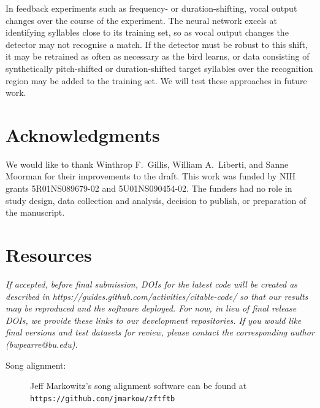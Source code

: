 \documentclass[10pt,letterpaper]{article}
\let\oldmarginpar\marginpar
\renewcommand{\marginpar}[1]{\oldmarginpar{\linespread{1}\scriptsize{#1}}}
\begin{document}
In feedback experiments such as frequency- or duration-shifting, vocal
output changes over the course of the experiment.  The neural network
excels at identifying syllables close to its training set, so as vocal
output changes the detector may not recognise a match.  If the
detector must be robust to this shift, it may be retrained as often as
necessary as the bird learns, or data consisting of synthetically
pitch-shifted or duration-shifted target syllables over the
recognition region may be added to the training set.  We will test
these approaches in future work.

\section{Acknowledgments}
We would like to thank Winthrop F.~Gillis, William A.~Liberti, and Sanne Moorman for
their improvements to the draft.  This work was funded by NIH grants
5R01NS089679-02 and 5U01NS090454-02.  The funders had no role in study design, data collection and analysis, decision to publish, or preparation of the manuscript.

\appendix

\section{Resources}
\label{sec:resources}

{\em If accepted, before final submission, DOIs for the latest code will be created as described in https://guides.github.com/activities/citable-code/ so that our results may be reproduced and the software deployed.  For now, in lieu of final release DOIs, we provide these links to our development repositories.  If you would like final versions and test datasets for review, please contact the corresponding author (bwpearre@bu.edu).}
\begin{description}
  \item[Song alignment:] Jeff Markowitz's song alignment software \cite{Poole2012} can be found at
    {\tt https://github.com/jmarkow/zftftb}
\end{description}
\end{document}
